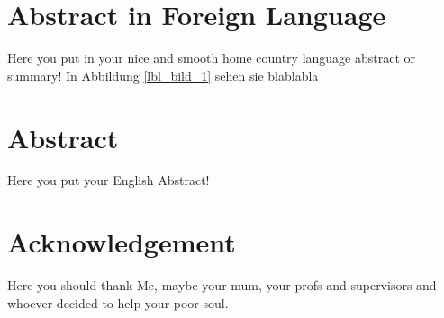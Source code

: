 \section*{Abstract in Foreign Language}
Here you put in your nice and smooth home country language abstract or summary! In Abbildung \ref{lbl_bild_1} sehen sie blablabla


\blankpage


\section*{Abstract}
Here you put your English Abstract!


\blankpage

\section*{Acknowledgement}
	
Here you should thank Me, maybe your mum, your profs and supervisors and whoever decided to help your poor soul.


